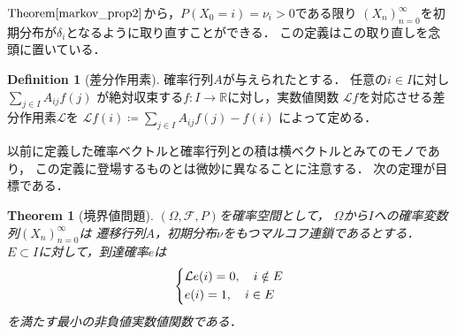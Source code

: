 \documentclass[dvipdfmx,autodetect-engine]{jsarticle}
\newtheorem{theorem}{Theorem}[section]
\theoremstyle{remark}
\theoremstyle{definition}
\newtheorem{definition}{Definition}[section]
\newcommand{\R}{\mathbb{R}}
\begin{document}
$\mathrm{Theorem}\ref{markov_prop2}$から，$P(X_0 = i)=\nu_i >0$である限り
$(X_n)_{n=0}^{\infty}$を初期分布が$\delta_i$となるように取り直すことができる．
この定義はこの取り直しを念頭に置いている．

\begin{definition}[差分作用素]
    確率行列$A$が与えられたとする．
    任意の$i \in I$に対し$\sum_{j \in I} A_{ij}f(j)$
    が絶対収束する$f\colon I \to \R$に対し，実数値関数
    $\mathcal{L}f$を対応させる差分作用素$\mathcal{L}$を
    $\mathcal{L}f(i) \coloneqq \sum_{j \in I} A_{ij}f(j) - f(i)$
    によって定める．
\end{definition}


以前に定義した確率ベクトルと確率行列との積は横ベクトルとみてのモノであり，
この定義に登場するものとは微妙に異なることに注意する．
次の定理が目標である．


\begin{theorem}[境界値問題]
    $(\Omega,\mathcal{F},P)$を確率空間として，
    $\Omega$から$I$への確率変数列$(X_n)_{n=0}^{\infty}$は
    遷移行列$A$，初期分布$\nu$をもつマルコフ連鎖であるとする．
    $E \subset I$に対して，到達確率$e$は
    \begin{align}
        \begin{dcases}
            \mathcal{L}e(i) = 0, \quad i \notin E \\
            e(i) = 1, \quad i \in E
        \end{dcases}
    \end{align}
    を満たす最小の非負値実数値関数である．
\end{theorem}
\end{document}
